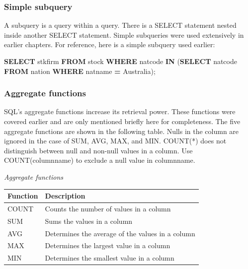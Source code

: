 \documentclass[
]{article}
\newenvironment{Shaded}{\begin{snugshade}}{\end{snugshade}}
\newcommand{\KeywordTok}[1]{\textcolor[rgb]{0.13,0.29,0.53}{\textbf{#1}}}
\newcommand{\NormalTok}[1]{#1}
\newcommand{\OperatorTok}[1]{\textcolor[rgb]{0.81,0.36,0.00}{\textbf{#1}}}
\newcommand{\StringTok}[1]{\textcolor[rgb]{0.31,0.60,0.02}{#1}}
\begin{document}
\hypertarget{simple-subquery}{%
\subsubsection*{Simple subquery}\label{simple-subquery}}

A subquery is a query within a query. There is a SELECT statement nested
inside another SELECT statement. Simple subqueries were used extensively
in earlier chapters. For reference, here is a simple subquery used
earlier:

\begin{Shaded}
\begin{Highlighting}[]
\KeywordTok{SELECT}\NormalTok{ stkfirm }\KeywordTok{FROM}\NormalTok{ stock}
    \KeywordTok{WHERE}\NormalTok{ natcode }\KeywordTok{IN}
\NormalTok{        (}\KeywordTok{SELECT}\NormalTok{ natcode }\KeywordTok{FROM}\NormalTok{ nation}
            \KeywordTok{WHERE}\NormalTok{ natname }\OperatorTok{=} \StringTok{\textquotesingle{}Australia\textquotesingle{}}\NormalTok{);}
\end{Highlighting}
\end{Shaded}

\hypertarget{aggregate-functions-1}{%
\subsubsection*{Aggregate functions}\label{aggregate-functions-1}}

SQL's aggregate functions increase its retrieval power. These functions
were covered earlier and are only mentioned briefly here for
completeness. The five aggregate functions are shown in the following
table. Nulls in the column are ignored in the case of SUM, AVG, MAX, and
MIN. COUNT(*) does not distinguish between null and non-null values in a
column. Use COUNT(columnname) to exclude a null value in columnname.

\emph{Aggregate functions}

\begin{longtable}[]{@{}ll@{}}
\toprule()
Function & Description \\
\midrule()
\endhead
COUNT & Counts the number of values in a column \\
SUM & Sums the values in a column \\
AVG & Determines the average of the values in a column \\
MAX & Determines the largest value in a column \\
MIN & Determines the smallest value in a column \\
\bottomrule()
\end{longtable}
\end{document}
